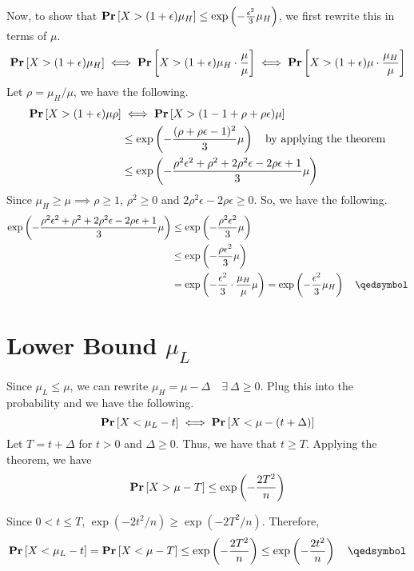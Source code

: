 Now, to show that $\mathbf{Pr}\left[X > (1 + \epsilon)\mu_H\right] \leq \exp\left(- \frac{\epsilon^2}{3}\mu_H\right)$, we first rewrite this in terms of $\mu$.
\[ \mathbf{Pr}\left[X > (1 + \epsilon)\mu_H\right] \iff \mathbf{Pr}\left[X > (1 + \epsilon)\mu_H\cdot\frac{\mu}{\mu}\right] \iff \mathbf{Pr}\left[X > (1 + \epsilon)\mu\cdot\frac{\mu_H}{\mu}\right] \]
Let $\rho = \mu_H / \mu$, we have the following.
\begin{equation*}
\begin{aligned}
	\mathbf{Pr}\left[X > (1 + \epsilon)\mu\rho\right] &\iff \mathbf{Pr}\left[X > (1 - 1 + \rho + \rho\epsilon)\mu\right] \\
								   &\leq \exp\left(-\frac{(\rho + \rho\epsilon - 1)^2}{3}\mu\right) \quad\text{by applying the theorem} \\
								   &\leq \exp\left(-\frac{\rho^2\epsilon^2 + \rho^2 + 2\rho^2\epsilon - 2\rho\epsilon + 1}{3}\mu\right)
\end{aligned}
\end{equation*}
Since $\mu_H\geq\mu \implies \rho \geq 1$, $\rho^2 \geq 0$ and $2\rho^2\epsilon - 2\rho\epsilon \geq 0$. So, we have the following.
\begin{equation*}
\begin{aligned}
	\exp\left(-\frac{\rho^2\epsilon^2 + \rho^2 + 2\rho^2\epsilon - 2\rho\epsilon + 1}{3}\mu\right)
		&\leq \exp\left(-\frac{\rho^2\epsilon^2}{3}\mu\right) \\
		&\leq \exp\left(-\frac{\rho\epsilon^2}{3}\mu\right) \\
		&= \exp\left(-\frac{\epsilon^2}{3}\cdot\frac{\mu_H}{\mu}\mu\right) = \exp\left(-\frac{\epsilon^2}{3}\mu_H\right) \quad \qedsymbol
\end{aligned}
\end{equation*}

\section{Lower Bound $\mu_L$}

Since $\mu_L \leq \mu$, we can rewrite $\mu_H = \mu - \Delta\quad\exists\ \Delta \geq 0$. Plug this into the probability and we have the following.
\[ \mathbf{Pr}\left[X < \mu_L - t\right] \iff \mathbf{Pr}\left[X < \mu - (t + \Delta)\right] \]
Let $T = t + \Delta$ for $t > 0$ and $\Delta \geq 0$. Thus, we have that $t \geq T$. Applying the theorem, we have
\[ \mathbf{Pr}\left[X > \mu - T\right] \leq \exp\left(- \frac{2T^2}{n}\right) \]

Since $0 < t \leq T$, $\exp(-2t^2 / n) \geq \exp(-2T^2 / n)$. Therefore,
\[ \pr{X < \mu_L - t} = \pr{X < \mu - T} \leq \exp\left(- \frac{2T^2}{n}\right) \leq \exp\left(-\frac{2t^2}{n}\right) \quad\qedsymbol \]

